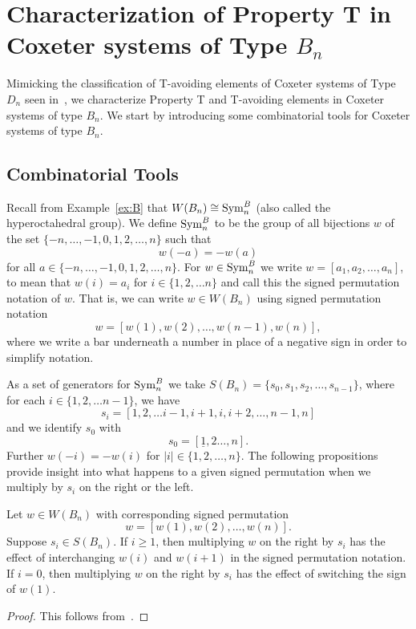 \chapter{Characterization of Property T in Coxeter systems of Type $B_n$}\label{chap:BnandCn}

Mimicking the classification of T-avoiding elements of Coxeter systems of Type $D_n$ seen in~\cite{Gern2013a}, we characterize Property T and T-avoiding elements in Coxeter systems of type $B_n$. We start by introducing some combinatorial tools for Coxeter systems of type $B_n$. 

\section{Combinatorial Tools}\label{sec:Btools}

Recall from Example~\ref{ex:B} that $W(B_n) \cong \mathrm{Sym}_n^B$ (also called the hyperoctahedral group). We define $\mathrm{Sym}_n^B$ to be the group of all bijections $w$ of the set $\{-n, \ldots, -1, 0, 1, 2, \ldots, n\}$ such that 
\[w(-a)=-w(a)\] for all $a \in \{-n, \ldots, -1, 0, 1, 2, \ldots, n\}$. For $w \in \mathrm{Sym}_n^B$ we write $w=[a_1, a_2, \ldots, a_n]$, to mean that $w(i)=a_i$ for $i \in \{1,2, \ldots n\}$ and call this the signed permutation notation of $w$. That is, we can write $w \in W(B_n)$ using signed permutation notation 
\[ w=[w(1),w(2), \ldots, w(n-1), w(n)], \]
where we write a bar underneath a number in place of a negative sign in order to simplify notation. 

As a set of generators for $\mathrm{Sym}_n^B$ we take $S(B_n)=\{s_0,s_1,s_2, \ldots, s_{n-1}\}$, where for each $i \in \{1,2,\ldots n-1\}$, we have
\[s_i=[1,2, \ldots i-1, i+1,i,i+2, \ldots, n-1,n] \] and we identify $s_0$ with
\[s_0=[\underline{1}, 2 \ldots, n].\] Further $w(-i)=-w(i)$ for $|i| \in \{1,2, \ldots, n\}$. The following propositions provide insight into what happens to a given signed permutation when we multiply by $s_i$ on the right or the left.

\begin{proposition}
	Let $w \in W(B_n)$ with corresponding signed permutation 
	\[w=[w(1),w(2), \ldots ,w(n)].\] Suppose $s_i \in S(B_n)$. If $i \geq 1$, then multiplying $w$ on the right by $s_i$ has the effect of interchanging $w(i)$ and $w(i+1)$ in  the signed permutation notation. If $i=0$, then multiplying $w$ on the right by $s_i$ has the effect of switching the sign of $w(1)$. 	
	\begin{proof}
	This follows from~\cite[Section 8.1 and A3.1]{Bjorner2005}.	
	\end{proof}
\end{proposition}

